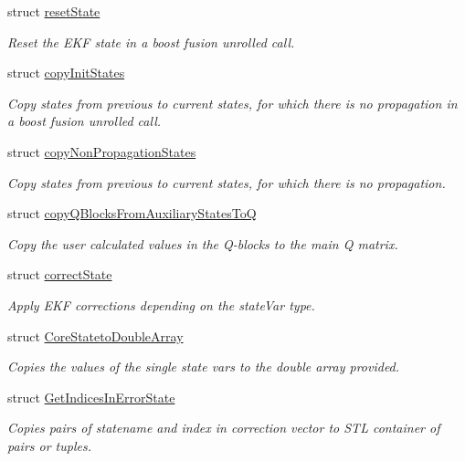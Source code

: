 \begin{DoxyCompactItemize}
struct \hyperlink{structmsf__tmp_1_1resetState}{reset\-State}
\begin{DoxyCompactList}\small\item\em Reset the E\-K\-F state in a boost fusion unrolled call. \end{DoxyCompactList}\item 
struct \hyperlink{structmsf__tmp_1_1copyInitStates}{copy\-Init\-States}
\begin{DoxyCompactList}\small\item\em Copy states from previous to current states, for which there is no propagation in a boost fusion unrolled call. \end{DoxyCompactList}\item 
struct \hyperlink{structmsf__tmp_1_1copyNonPropagationStates}{copy\-Non\-Propagation\-States}
\begin{DoxyCompactList}\small\item\em Copy states from previous to current states, for which there is no propagation. \end{DoxyCompactList}\item 
struct \hyperlink{structmsf__tmp_1_1copyQBlocksFromAuxiliaryStatesToQ}{copy\-Q\-Blocks\-From\-Auxiliary\-States\-To\-Q}
\begin{DoxyCompactList}\small\item\em Copy the user calculated values in the Q-\/blocks to the main Q matrix. \end{DoxyCompactList}\item 
struct \hyperlink{structmsf__tmp_1_1correctState}{correct\-State}
\begin{DoxyCompactList}\small\item\em Apply E\-K\-F corrections depending on the state\-Var type. \end{DoxyCompactList}\item 
struct \hyperlink{structmsf__tmp_1_1CoreStatetoDoubleArray}{Core\-Stateto\-Double\-Array}
\begin{DoxyCompactList}\small\item\em Copies the values of the single state vars to the double array provided. \end{DoxyCompactList}\item 
struct \hyperlink{structmsf__tmp_1_1GetIndicesInErrorState}{Get\-Indices\-In\-Error\-State}
\begin{DoxyCompactList}\small\item\em Copies pairs of statename and index in correction vector to S\-T\-L container of pairs or tuples. \end{DoxyCompactList}\item 

\end{DoxyCompactItemize}
